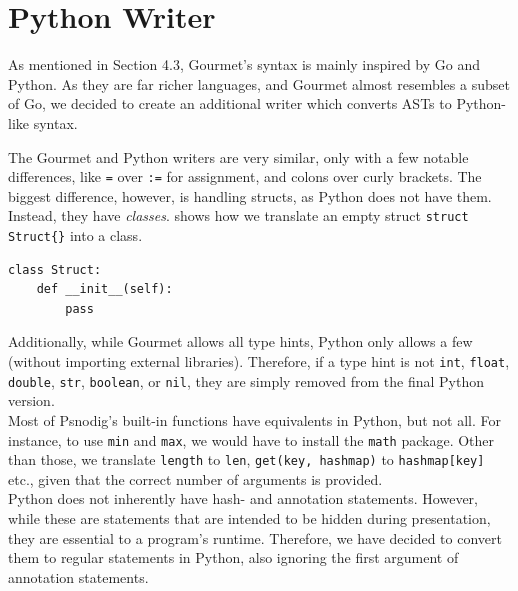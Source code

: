 \section{Python Writer}

As mentioned in Section 4.3, Gourmet's syntax is mainly inspired by Go and Python. As they are far richer languages, and Gourmet almost resembles a subset of Go, we decided to create an additional writer which converts ASTs to Python-like syntax.

The Gourmet and Python writers are very similar, only with a few notable differences, like \texttt{=} over \texttt{:=} for assignment, and colons over curly brackets. The biggest difference, however, is handling structs, as Python does not have them. Instead, they have \textit{classes}.  shows how we translate an empty struct \texttt{struct Struct\{\}} into a class. \\

\begin{lstlisting}[caption={The Python equivalent of an empty struct in Gourmet.}, captionpos=b, label={The Python equivalent of an empty struct in Gourmet.}]
class Struct:
    def __init__(self):
        pass
\end{lstlisting}

Additionally, while Gourmet allows all type hints, Python only allows a few (without importing external libraries). Therefore, if a type hint is not \texttt{int}, \texttt{float}, \texttt{double}, \texttt{str}, \texttt{boolean}, or \texttt{nil}, they are simply removed from the final Python version. \\

Most of Psnodig's built-in functions have equivalents in Python, but not all. For instance, to use \texttt{min} and \texttt{max}, we would have to install the \texttt{math} package. Other than those, we translate \texttt{length} to \texttt{len}, \texttt{get(key, hashmap)} to \texttt{hashmap[key]} etc., given that the correct number of arguments is provided. \\

Python does not inherently have hash- and annotation statements. However, while these are statements that are intended to be hidden during presentation, they are essential to a program's runtime. Therefore, we have decided to convert them to regular statements in Python, also ignoring the first argument of annotation statements. \\

